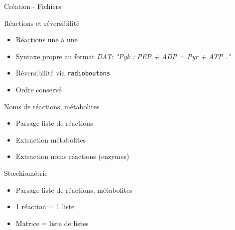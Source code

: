 \documentclass{beamer}
\begin{document}
\begin{frame}{\textcolor{bleu2}{\hspace{1cm}Création - Fichiers}}
\footnotesize
	\begin{center}
		\begin{minipage}[c]{1\textwidth}
			\begin{block}{\hspace{0.2cm}Réactions et réversibilité}
				\begin{itemize}
					\item Réactions une à une
					\item Syntaxe propre au format \emph{DAT}: \emph{"Pyk : PEP + ADP = Pyr + ATP ."}
					\item Réversibilité via \texttt{radioboutons}
					\item Ordre conservé
				\end{itemize}
			\end{block}
			\begin{block}{\hspace{0.2cm}Noms de réactions, métabolites}
				\begin{itemize}
					\item Parsage liste de réactions
					\item Extraction métabolites
					\item Extraction noms réactions (enzymes)
				\end{itemize}
			\end{block}
			\begin{block}{\hspace{0.2cm}Stœchiométrie}
				\begin{itemize}
					\item Parsage liste de réactions, métabolites
					\item 1 réaction = 1 liste
					\item Matrice = liste de listes
				\end{itemize}
			\end{block}
		\end{minipage}
	\end{center}
\end{frame}
\end{document}
